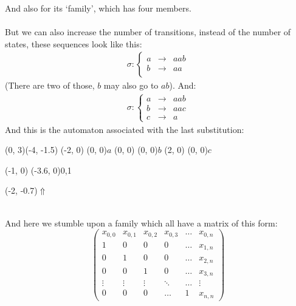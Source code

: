 \documentclass{article}
\begin{document}
And also for its `family', which has four members.\\
\\
But we can also increase the number of transitions, instead of the number of
states, these sequences look like this:\\
\begin{eqnarray*}
\sigma: \left\{ \begin{array}{lll}
a &\rightarrow& aab\\
b &\rightarrow& aa\\
\end{array} \right.
\end{eqnarray*}
(There are two of those, $b$ may also go to $ab$). And:
\begin{eqnarray*}
\sigma: \left\{ \begin{array}{lll}
a &\rightarrow& aab\\
b &\rightarrow& aac\\
c &\rightarrow& a
\end{array} \right.
\end{eqnarray*}
And this is the automaton associated with the last substitution:\\
\begin{graph}(0, 3)(-4, -1.5)
  (-2, 0) (0, 0){$a$}
  (0, 0)  (0, 0){$b$}
  (2, 0)  (0, 0){$c$}

  (-1, 0) \freetext(-3.6, 0){0,1}
   
   
   
   

  \freetext(-2, -0.7){$\Uparrow$}
\end{graph}\\
And here we stumble upon a family which all have a matrix of this form:
\begin{displaymath}
\left( \begin{array}{cccccc}
x_{0, 0} & x_{0, 1} & x_{0, 2} & x_{0, 3} & \ldots & x_{0, n}\\
1 & 0 & 0 & 0 & \ldots & x_{1, n}\\
0 & 1 & 0 & 0 & \ldots & x_{2, n}\\
0 & 0 & 1 & 0 & \ldots & x_{3, n}\\
\vdots & \vdots & \vdots & \ddots & \ldots & \vdots\\
0 & 0 & 0 & \ldots & 1 & x_{n, n}
\end{array} \right)
\end{displaymath}
\end{document}
